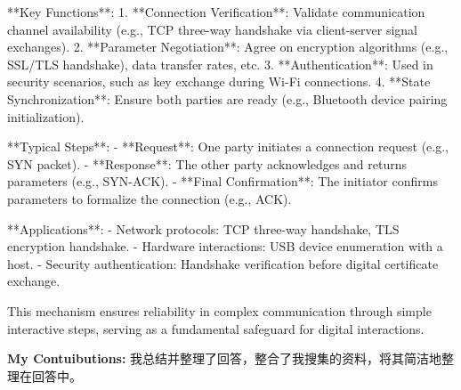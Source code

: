 \documentclass[11pt, a4 paper]{article}
\begin{document}
**Key Functions**:  
1. **Connection Verification**: Validate communication channel availability (e.g., TCP three-way handshake via client-server signal exchanges).  
2. **Parameter Negotiation**: Agree on encryption algorithms (e.g., SSL/TLS handshake), data transfer rates, etc.  
3. **Authentication**: Used in security scenarios, such as key exchange during Wi-Fi connections.  
4. **State Synchronization**: Ensure both parties are ready (e.g., Bluetooth device pairing initialization).  

**Typical Steps**:  
- **Request**: One party initiates a connection request (e.g., SYN packet).  
- **Response**: The other party acknowledges and returns parameters (e.g., SYN-ACK).  
- **Final Confirmation**: The initiator confirms parameters to formalize the connection (e.g., ACK).  

**Applications**:  
- Network protocols: TCP three-way handshake, TLS encryption handshake.  
- Hardware interactions: USB device enumeration with a host.  
- Security authentication: Handshake verification before digital certificate exchange.  

This mechanism ensures reliability in complex communication through simple interactive steps, serving as a fundamental safeguard for digital interactions.

\textbf{My Contuibutions:} 我总结并整理了回答，整合了我搜集的资料，将其简洁地整理在回答中。
\end{document}
